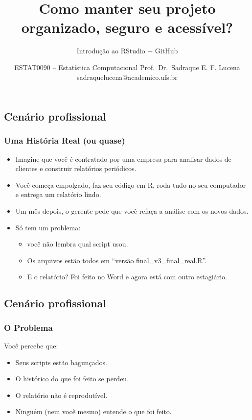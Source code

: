 \documentclass[
  letterpaper,
  DIV=11,
  numbers=noendperiod]{scrartcl}
\title{Como manter seu projeto organizado, seguro e acessível?}
\subtitle{{Introdução ao RStudio + GitHub}}
\author{ESTAT0090 -- Estatística Computacional Prof.~Dr.~Sadraque E. F.
Lucena {sadraquelucena@academico.ufs.br}}
\date{}
\providecommand{\tightlist}{%
  \setlength{\itemsep}{0pt}\setlength{\parskip}{0pt}}
\begin{document}
\maketitle


\subsection{Cenário profissional}\label{cenuxe1rio-profissional}

\subsubsection{Uma História Real (ou
quase)}\label{uma-histuxf3ria-real-ou-quase}

\begin{itemize}
\item
  Imagine que você é contratado por uma empresa para analisar dados de
  clientes e construir relatórios periódicos.
\item
  Você começa empolgado, faz seu código em R, roda tudo no seu
  computador e entrega um relatório lindo.
\item
  Um mês depois, o gerente pede que você refaça a análise com os novos
  dados.
\item
  Só tem um problema:

  \begin{itemize}
  \tightlist
  \item
    você não lembra qual script usou.
  \item
    Os arquivos estão todos em ``versão final\_v3\_final\_real.R''.
  \item
    E o relatório? Foi feito no Word e agora está com outro estagiário.
  \end{itemize}
\end{itemize}

\subsection{Cenário profissional}\label{cenuxe1rio-profissional-1}

\subsubsection{O Problema}\label{o-problema}

Você percebe que:

\begin{itemize}
\item
  Seus scripts estão bagunçados.
\item
  O histórico do que foi feito se perdeu.
\item
  O relatório não é reprodutível.
\item
  Ninguém (nem você mesmo) entende o que foi feito.
\end{itemize}
\end{document}
